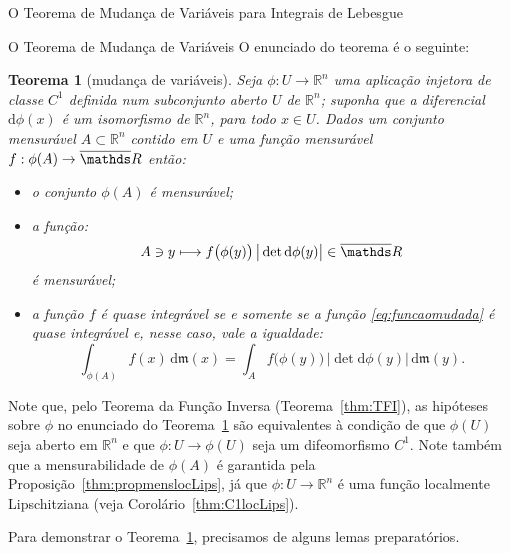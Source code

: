 \documentclass[oneside,final,11pt]{amsbook}
\newcommand{\R}{\mathds R}
\newcommand{\leb}{\mathfrak m}
\newcommand{\dd}{\mathrm d}
\theoremstyle{remark}\newtheorem{exercise}{Exercício}[chapter]
\theoremstyle{remark}\newtheorem{*exercise}[exercise]{\hbox to 0pt{\hskip 0pt minus 1fil*}Exercício}
\theoremstyle{definition}\newtheorem{exdefin}{Definição}[chapter]
\theoremstyle{plain}\newtheorem{teo}{Teorema}[section]
\theoremstyle{plain}\newtheorem{lem}[teo]{Lema}
\theoremstyle{plain}\newtheorem{prop}[teo]{Proposição}
\theoremstyle{plain}\newtheorem{cor}[teo]{Corolário}
\theoremstyle{definition}\newtheorem{defin}[teo]{Definição}
\theoremstyle{remark}\newtheorem{rem}[teo]{Observação}
\theoremstyle{definition}\newtheorem{notation}[teo]{Notação}
\theoremstyle{definition}\newtheorem{convention}[teo]{Convenção}
\theoremstyle{definition}\newtheorem{example}[teo]{Exemplo}
\numberwithin{section}{chapter}
\numberwithin{equation}{section}
\begin{document}
\begin{chapter}{O Teorema de Mudança de Variáveis para Integrais de Lebesgue}
\begin{section}{O Teorema de Mudança de Variáveis}
O enunciado do teorema é o seguinte:
\begin{teo}[mudança de variáveis]
\label{thm:teomudvar}
Seja $\phi:U\to\R^n$ uma aplicação {\em injetora\/} de classe $C^1$ definida num subconjunto
aberto $U$ de $\R^n$; suponha que a diferencial $\dd\phi(x)$ é um isomorfismo de $\R^n$, para
todo $x\in U$.
Dados um conjunto mensurável $A\subset\R^n$ contido em $U$ e uma função mensurável
$f:\phi(A)\to\overline\R$ então:
\begin{itemize}
\item o conjunto $\phi(A)$ é mensurável;
\item a função:
\begin{equation}\label{eq:funcaomudada}
A\ni y\longmapsto f\big(\phi(y)\big)\,\big\vert\det\dd\phi(y)\big\vert\in\overline\R
\end{equation}
é mensurável;
\item a função $f$ é quase integrável se e somente se a função \eqref{eq:funcaomudada} é
quase integrável e, nesse caso, vale a igualdade:
\begin{equation}\label{eq:eqmudvar}
\int_{\phi(A)}f(x)\,\dd\leb(x)=\int_Af\big(\phi(y)\big)\,\big\vert\det\dd\phi(y)\big\vert\,\dd\leb(y).
\end{equation}
\end{itemize}
\end{teo}

Note que, pelo Teorema da Função Inversa (Teorema~\ref{thm:TFI}), as hipóteses sobre $\phi$
no enunciado do Teorema~\ref{thm:teomudvar} são equivalentes à condição de que $\phi(U)$
seja aberto em $\R^n$ e que $\phi:U\to\phi(U)$
seja um difeomorfismo $C^1$. Note também que a mensurabilidade
de $\phi(A)$ é garantida pela Proposição~\ref{thm:propmenslocLips}, já que $\phi:U\to\R^n$
é uma função localmente Lipschitziana (veja Corolário~\ref{thm:C1locLips}).

Para demonstrar o Teorema~\ref{thm:teomudvar}, precisamos de alguns lemas preparatórios.


\end{section}
\end{chapter}
\end{document}
